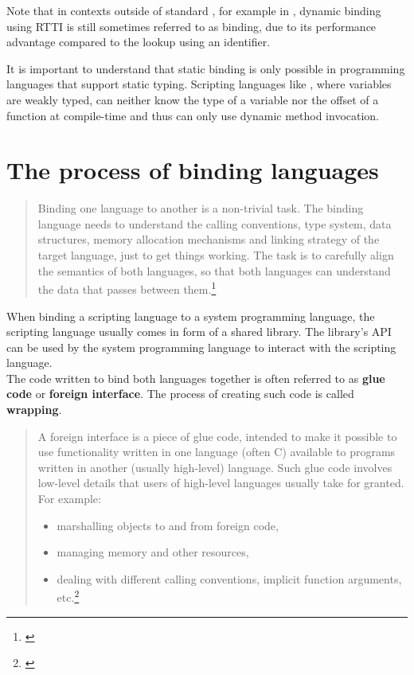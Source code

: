 Note that in contexts outside of standard , for example in , dynamic binding using RTTI is still sometimes referred to as  binding, due to its performance advantage compared to the lookup using an identifier.

It is important to understand that static binding is only possible in programming languages that support static typing. Scripting languages like , where variables are weakly typed, can neither know the type of a variable nor the offset of a function at compile-time and thus can only use dynamic method invocation.

\section{The process of binding languages}

\begin{quotation}
Binding one language to another is a non-trivial task. The binding language needs to understand the calling conventions, type system, data structures, memory allocation mechanisms and linking strategy of the target language, just to get things working. The task is to carefully align the semantics of both languages, so that both languages can understand the data that passes between them.\footnote{\citep{RealWorldHaskell}}
\end{quotation}

When binding a scripting language to a system programming language, the scripting language usually comes in form of a shared library. The library's API can be used by the system programming language to interact with the scripting language.\\
The code written to bind both languages together is often referred to as \textbf{glue code} or \textbf{foreign interface}. The process of creating such code is called \textbf{wrapping}.

\begin{quotation}
A foreign interface is a piece of glue code, intended to make it possible to use functionality written in one language (often C) available to programs written in another (usually high-level) language. Such glue code involves low-level details that users of high-level languages usually take for granted. For example:
\begin{itemize}
\item marshalling objects to and from foreign code,
\item managing memory and other resources,
\item dealing with different calling conventions, implicit function arguments, etc.\footnote{\citep{FFIScheme}}
\end{itemize}
\end{quotation}

